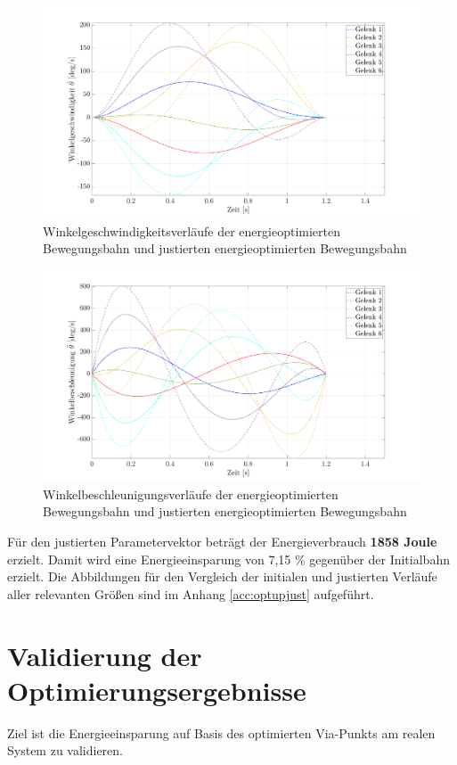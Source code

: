 \begin{figure}[tbph]
	\centering
	\includegraphics[width=1\linewidth]{images/Optimierungsergebnisse_up/veloptedit}
	\caption{Winkelgeschwindigkeitsverläufe der energieoptimierten Bewegungsbahn und justierten energieoptimierten Bewegungsbahn}
	\label{fig:veloptedit}
\end{figure}
%
\begin{figure}[tbph]
	\centering
	\includegraphics[width=1\linewidth]{images/Optimierungsergebnisse_up/accoptedit}
	\caption{Winkelbeschleunigungsverläufe der energieoptimierten Bewegungsbahn und justierten energieoptimierten Bewegungsbahn}
	\label{fig:accoptedit}
\end{figure}
%
Für den justierten Parametervektor beträgt der Energieverbrauch \textbf{1858 Joule} erzielt. Damit wird eine Energieeinsparung von 7,15 \% gegenüber der Initialbahn erzielt. Die Abbildungen für den Vergleich der initialen und justierten Verläufe aller relevanten Größen sind im Anhang \ref{acc:optupjust} aufgeführt.



\section{Validierung der Optimierungsergebnisse}
Ziel ist die Energieeinsparung auf Basis des optimierten Via-Punkts am realen System zu validieren. 
%
